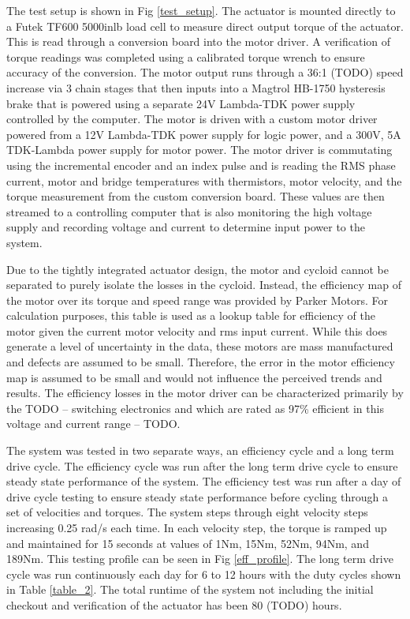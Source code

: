 \documentclass[letterpaper, 10 pt, conference]{ieeeconf}  %
\begin{document}
The test setup is shown in Fig \ref{test_setup}. The actuator is mounted directly to a Futek TF600 5000inlb load cell to measure direct output torque of the actuator. This is read through a conversion board into the motor driver. A verification of torque readings was completed using a calibrated torque wrench to ensure accuracy of the conversion. The motor output runs through a 36:1 (TODO) speed increase via 3 chain stages that then inputs into a Magtrol HB-1750 hysteresis brake that is powered using a separate 24V Lambda-TDK power supply controlled by the computer. The motor is driven with a custom motor driver powered from a 12V Lambda-TDK power supply for logic power, and a 300V, 5A TDK-Lambda power supply for motor power. The motor driver is commutating using the incremental encoder and an index pulse and is reading the RMS phase current, motor and bridge temperatures with thermistors, motor velocity, and the torque measurement from the custom conversion board. These values are then streamed to a controlling computer that is also monitoring the high voltage supply and recording voltage and current to determine input power to the system. 

Due to the tightly integrated actuator design, the motor and cycloid cannot be separated to purely isolate the losses in the cycloid. Instead, the efficiency map of the motor over its torque and speed range was provided by Parker Motors. For calculation purposes, this table is used as a lookup table for efficiency of the motor given the current motor velocity and rms input current. While this does generate a level of uncertainty in the data, these motors are mass manufactured and defects are assumed to be small. Therefore, the error in the motor efficiency map is assumed to be small and would not influence the perceived trends and results. The efficiency losses in the motor driver can be characterized primarily by the TODO -- switching electronics and which are rated as 97\% efficient in this voltage and current range -- TODO. 

The system was tested in two separate ways, an efficiency cycle and a long term drive cycle. The efficiency cycle was run after the long term drive cycle to ensure steady state performance of the system. The efficiency test was run after a day of drive cycle testing to ensure steady state performance before cycling through a set of velocities and torques. The system steps through eight velocity steps increasing 0.25 rad/s each time. In each velocity step, the torque is ramped up and maintained for 15 seconds at values of 1Nm, 15Nm, 52Nm, 94Nm, and 189Nm. This testing profile can be seen in Fig \ref{eff_profile}. The long term drive cycle was run continuously each day for 6 to 12 hours with the duty cycles shown in Table \ref{table_2}. The total runtime of the system not including the initial checkout and verification of the actuator has been 80 (TODO) hours. 
\end{document}

